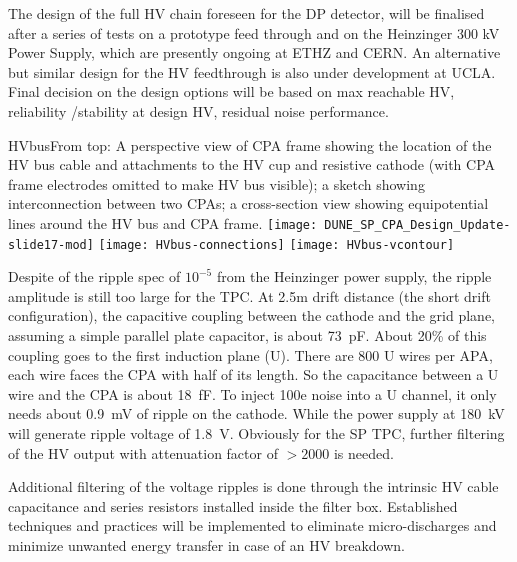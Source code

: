 The design of the full HV chain foreseen for the DP detector, will be finalised  after a series of tests on a prototype feed through and on the Heinzinger 300 kV Power Supply, which are presently ongoing at ETHZ and CERN. An alternative but similar design for the HV feedthrough is also under development at UCLA. Final decision on the design options will be based on max reachable HV, reliability /stability at design HV, residual noise performance.


\begin{cdrfigure}{HVbus}{From top: A perspective view of CPA frame showing the location of the HV bus cable and attachments to the HV cup and resistive cathode (with CPA frame electrodes omitted to make HV bus visible); a sketch showing interconnection between two CPAs; a cross-section view showing equipotential lines around the HV bus and CPA frame.}
  \texttt{[image: DUNE\_SP\_CPA\_Design\_Update-slide17-mod]}
  \texttt{[image: HVbus-connections]}
  \texttt{[image: HVbus-vcontour]}
\end{cdrfigure}



Despite of the ripple spec of $10^{-5}$ from the Heinzinger power supply, the ripple amplitude is still too large for the TPC.  At 2.5m drift distance (the short drift configuration), the capacitive coupling between the cathode and the grid plane, assuming a simple parallel plate capacitor, is about 73~pF.  About 20\% of this coupling goes to the first induction plane (U).  There are 800 U wires per APA, each wire faces the CPA with half of its length. So the capacitance between a U wire and the CPA is about 18~fF.  To inject 100e noise into a U channel, it only needs about 0.9~mV of ripple on the cathode.  While the power supply at 180~kV will generate ripple voltage of 1.8~V.  Obviously for the SP TPC, further filtering of the HV output with attenuation factor of $>2000$ is needed. 

Additional filtering of the voltage ripples is done
through the intrinsic HV cable capacitance and series resistors
installed inside the filter box. Established techniques and practices
will be implemented to eliminate micro-discharges and minimize
unwanted energy transfer in case of an HV breakdown.


